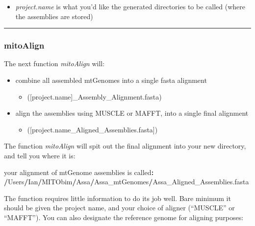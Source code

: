 \documentclass[
]{article}
\newenvironment{Shaded}{\begin{snugshade}}{\end{snugshade}}
\newcommand{\ErrorTok}[1]{\textcolor[rgb]{0.64,0.00,0.00}{\textbf{#1}}}
\newcommand{\NormalTok}[1]{#1}
\newcommand{\OperatorTok}[1]{\textcolor[rgb]{0.81,0.36,0.00}{\textbf{#1}}}
\newcommand{\StringTok}[1]{\textcolor[rgb]{0.31,0.60,0.02}{#1}}
\providecommand{\tightlist}{%
  \setlength{\itemsep}{0pt}\setlength{\parskip}{0pt}}
\begin{document}
\begin{itemize}
\tightlist
\item
  \emph{project.name} is what you'd like the generated directories to be
  called (where the assemblies are stored)
\end{itemize}

\begin{center}\rule{0.5\linewidth}{0.5pt}\end{center}

\hypertarget{mitoalign}{%
\subsubsection{mitoAlign}\label{mitoalign}}

The next function \emph{mitoAlign} will:

\begin{itemize}
\tightlist
\item
  combine all assembled mtGenomes into a single fasta alignment

  \begin{itemize}
  \tightlist
  \item
    ({[}project.name{]}\_Assembly\_Alignment.fasta)\\
  \end{itemize}
\item
  align the assemblies using MUSCLE or MAFFT, into a single final
  alignment

  \begin{itemize}
  \tightlist
  \item
    ({[}project.name\_Aligned\_Assemblies.fasta{]})
  \end{itemize}
\end{itemize}

The function \emph{mitoAlign} will spit out the final alignment into
your new directory, and tell you where it is:

\begin{Shaded}
\begin{Highlighting}[]
\NormalTok{your alignment of mtGenome assemblies is called}\OperatorTok{:}
\StringTok{  }\ErrorTok{/}\NormalTok{Users}\OperatorTok{/}\NormalTok{Ian}\OperatorTok{/}\NormalTok{MITObim}\OperatorTok{/}\NormalTok{Assa}\OperatorTok{/}\NormalTok{Assa_mtGenomes}\OperatorTok{/}\NormalTok{Assa_Aligned_Assemblies.fasta}
\end{Highlighting}
\end{Shaded}

The function requires little information to do its job well. Bare
minimum it should be given the project name, and your choice of aligner
(``MUSCLE'' or ``MAFFT''). You can also designate the reference genome
for aligning purposes:
\end{document}
